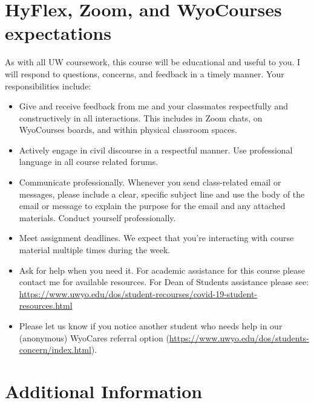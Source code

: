 \documentclass[11pt, letterpaper]{article}
\begin{document}
\section*{HyFlex, Zoom, and WyoCourses expectations}
As with all UW coursework, this course will be educational and useful to you. I will respond to questions, concerns, and feedback in a timely manner. Your responsibilities include:
\begin{itemize}
  \setlength\itemsep{0em}
  \item Give and receive feedback from me and your classmates respectfully and constructively in all interactions. This includes in Zoom chats, on WyoCourses boards, and within physical classroom spaces.
  \item Actively engage in civil discourse in a respectful manner. Use professional language in all course related forums.
  \item Communicate professionally. Whenever you send class-related email or messages, please include a clear, specific subject line and use the body of the email or message to explain the purpose for the email and any attached materials. Conduct yourself professionally.
  \item Meet assignment deadlines. We expect that you're interacting with course material multiple times during the week.
  \item Ask for help when you need it. For academic assistance for this course please contact me for available resources. For Dean of Students assistance please see: \url{https://www.uwyo.edu/dos/student-recourses/covid-19-student-resources.html}
  \item Please let us know if you notice another student who needs help in our (anonymous) WyoCares referral option (\url{https://www.uwyo.edu/dos/students-concern/index.html}).
\end{itemize}

\section*{Additional Information}
\end{document}
